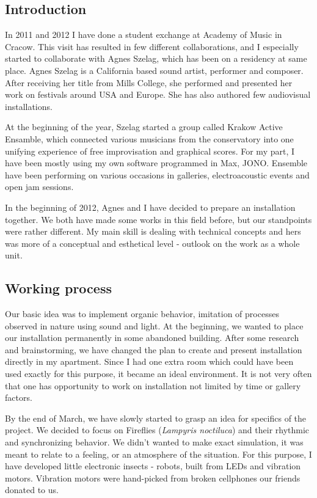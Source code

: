 \documentclass[11pt,a4paper,oneside]{report}
\begin{document}
\subsection{Introduction} In 2011 and 2012 I have done a student exchange at Academy of Music in Cracow. This visit has resulted in few different collaborations, and I especially started to collaborate with Agnes Szelag, which has been on a residency at same place. Agnes Szelag is a California based sound artist, performer and composer. After receiving her title from Mills College, she performed and presented her work on festivals around USA and Europe. She has also authored few audiovisual installations. 

At the beginning of the year, Szelag started a group called Krakow Active Ensamble, which connected various musicians from the conservatory into one unifying experience of free improvisation and graphical scores. For my part, I have been mostly using my own software programmed in Max, JONO. Ensemble have been performing on various occasions in galleries, electroacoustic events and open jam sessions.

In the beginning of 2012, Agnes and I have decided to prepare an installation together. We both have made some works in this field before, but our standpoints were rather different. My main skill is dealing with technical concepts and hers was more of a conceptual and esthetical level - outlook on the work as a whole unit. 

\subsection{Working process} Our basic idea was to implement organic behavior, imitation of processes observed in nature using sound and light. At the beginning, we wanted to place our installation permanently in some abandoned building. After some research and brainstorming, we have changed the plan to create and present installation directly in my apartment. Since I had one extra room which could have been used exactly for this purpose, it became an ideal environment. It is not very often that one has opportunity to work on installation not limited by time or gallery factors.

By the end of March, we have slowly started to grasp an idea for specifics of the project. We decided to focus on Fireflies (\emph{Lampyris noctiluca}) and their rhythmic and synchronizing behavior. We didn't wanted to make exact simulation, it was meant to relate to a feeling, or an atmosphere of the situation. For this purpose, I have developed little electronic insects - robots, built from LEDs and vibration motors. Vibration motors were hand-picked from broken cellphones our friends donated to us. 
\end{document}
